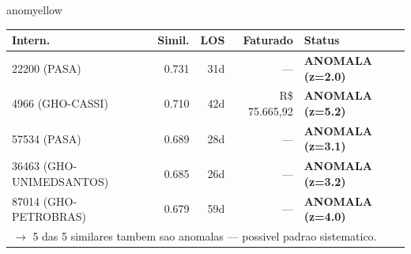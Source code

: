 \documentclass[a4paper,10pt]{article}
\begin{document}
\begin{anomalycard}[Internacao 11758 | GHO-REALGRANDEZA | MODERADO (z=2.05)]{anomyellow}
\begin{tabular}{l r r r l}\toprule\textbf{Intern.} & \textbf{Simil.} & \textbf{LOS} & \textbf{Faturado} & \textbf{Status} \\\midrule
22200 (PASA) & 0.731 & 31d & --- & \textcolor{anomred}{\textbf{ANOMALA (z=2.0)}} \\
4966 (GHO-CASSI) & 0.710 & 42d & R\$ 75.665,92 & \textcolor{anomred}{\textbf{ANOMALA (z=5.2)}} \\
57534 (PASA) & 0.689 & 28d & --- & \textcolor{anomred}{\textbf{ANOMALA (z=3.1)}} \\
36463 (GHO-UNIMEDSANTOS) & 0.685 & 26d & --- & \textcolor{anomred}{\textbf{ANOMALA (z=3.2)}} \\
87014 (GHO-PETROBRAS) & 0.679 & 59d & --- & \textcolor{anomred}{\textbf{ANOMALA (z=4.0)}} \\
\multicolumn{5}{l}{\textcolor{anomred}{\small $\rightarrow$ 5 das 5 similares tambem sao anomalas --- possivel padrao sistematico.}} \\
\bottomrule\end{tabular}


\end{anomalycard}

\newpage
\end{document}

